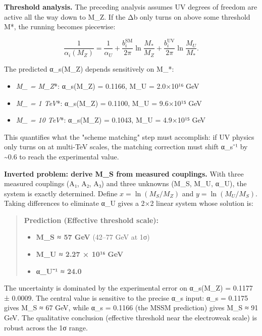 \textbf{Threshold analysis.} The preceding analysis assumes UV degrees of freedom are active all the way down to M\_Z. If the Δb only turns on above some threshold M*, the running becomes piecewise:

\[
\frac{1}{\alpha_i(M_Z)} = \frac{1}{\alpha_U} + \frac{b_i^\mathrm{SM}}{2\pi}
\ln\frac{M_\ast}{M_Z} + \frac{b_i^\mathrm{UV}}{2\pi}\ln\frac{M_U}{M_\ast}.
\]

The predicted α\_s(M\_Z) depends sensitively on M\_*:

\begin{itemize}
\tightlist
\item
  \emph{\emph{M\_} = M\_Z}*: α\_s(M\_Z) = 0.1166, M\_U = 2.0×10¹⁶ GeV
\item
  \emph{\emph{M\_} = 1 TeV}*: α\_s(M\_Z) = 0.1100, M\_U = 9.6×10¹⁵ GeV
\item
  \emph{\emph{M\_} = 10 TeV}*: α\_s(M\_Z) = 0.1043, M\_U = 4.9×10¹⁵ GeV
\end{itemize}

This quantifies what the "scheme matching" step must accomplish: if UV physics only turns on at multi-TeV scales, the matching correction must shift α\_s⁻¹ by \textasciitilde0.6 to reach the experimental value.

\textbf{Inverted problem: derive M\_S from measured couplings.} With three measured couplings (A₁, A₂, A₃) and three unknowns (M\_S, M\_U, α\_U), the system is exactly determined. Define \(x = \ln(M_S/M_Z)\) and \(y = \ln(M_U/M_S)\). Taking differences to eliminate α\_U gives a 2×2 linear system whose solution is:

\begin{quote}
\textbf{Prediction (Effective threshold scale):}

\begin{itemize}
\tightlist
\item
  \textbf{M\_S ≈ 57 GeV} (42--77 GeV at 1σ)
\item
  \textbf{M\_U ≈ 2.27 × 10¹⁶ GeV}
\item
  \textbf{α\_U⁻¹ ≈ 24.0}
\end{itemize}
\end{quote}

The uncertainty is dominated by the experimental error on α\_s(M\_Z) = 0.1177 ± 0.0009. The central value is sensitive to the precise α\_s input: α\_s = 0.1175 gives M\_S ≈ 67 GeV, while α\_s = 0.1166 (the MSSM prediction) gives M\_S ≈ 91 GeV. The qualitative conclusion (effective threshold near the electroweak scale) is robust across the 1σ range.

